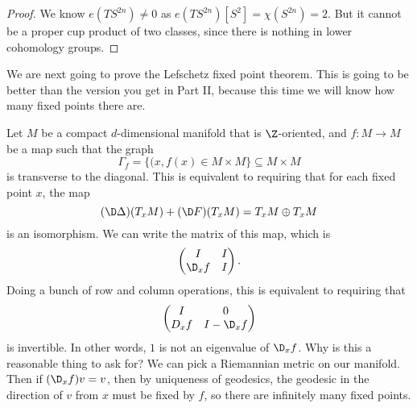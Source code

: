 \documentclass[a4paper]{article}
\begin{document}
\begin{proof}
  We know $e(TS^{2n}) \not= 0$ as $e(TS^{2n})[S^2] = \chi(S^{2n}) = 2$. But it cannot be a proper cup product of two classes, since there is nothing in lower cohomology groups.
\end{proof}

We are next going to prove the Lefschetz fixed point theorem. This is going to be better than the version you get in Part II, because this time we will know how many fixed points there are.

Let $M$ be a compact $d$-dimensional manifold that is $\Z$-oriented, and $f: M \to M$ be a map such that the graph
\[
  \Gamma_f = \{(x, f(x) \in M \times M\} \subseteq M \times M
\]
is transverse to the diagonal. This is equivalent to requiring that for each fixed point $x$, the map
\[
  (\D \Delta)(T_x M) + (\D F)(T_x M) = T_x M \oplus T_x M
\]
is an isomorphism. We can write the matrix of this map, which is
\[
  \begin{pmatrix}
    I & I\\
    \D_x f & I
  \end{pmatrix}.
\]
Doing a bunch of row and column operations, this is equivalent to requiring that
\[
  \begin{pmatrix}
    I & 0\\
    D_x f & I - \D_x f
  \end{pmatrix}
\]
is invertible. In other words, $1$ is not an eigenvalue of $\D_x f$. Why is this a reasonable thing to ask for? We can pick a Riemannian metric on our manifold. Then if $(\D_x f) v = v$, then by uniqueness of geodesics, the geodesic in the direction of $v$ from $x$ must be fixed by $f$, so there are infinitely many fixed points.
\end{document}
